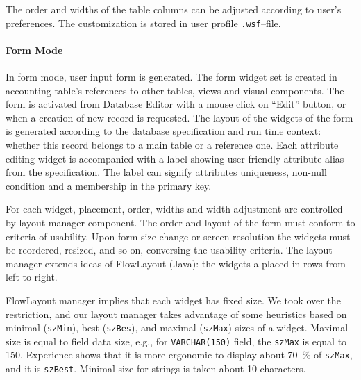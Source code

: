 \documentclass[conference]{IEEEtran}
\begin{document}
The order and widths of the table columns can be adjusted according to user's preferences.  The customization is stored in user profile \texttt{.wsf}--file.

\paragraph{Form Mode}

In form mode, user input form is generated.  The form widget set is created in accounting table's references to other tables, views and visual components.  The form is activated from Database Editor with a mouse click on ``Edit'' button, or when a creation of new record is requested.  The layout of the widgets of the form is generated according to the database specification and run time context: whether this record belongs to a main table or a reference one.  Each attribute editing widget is accompanied with a label showing user-friendly attribute alias from the specification.  The label can signify attributes uniqueness, non-null condition and a membership in the primary key.

For each widget, placement, order, widths and width adjustment are controlled by layout manager component.  The order and layout of the form must conform to criteria of usability.  Upon form size change or screen resolution the widgets must be reordered, resized, and so on, conversing the usability criteria.  The layout manager extends ideas of FlowLayout \cite{flowj} (Java): the widgets a placed in rows from left to right.

FlowLayout manager implies that each widget has fixed size.  We took over the restriction, and our layout manager takes advantage of some heuristics based on minimal (\texttt{szMin}), best (\texttt{szBes}), and maximal (\texttt{szMax}) sizes of a widget.  Maximal size is equal to field data size, e.g., for \texttt{VARCHAR(150)} field, the \texttt{szMax} is equal to 150.  Experience shows that it is more ergonomic to display about 70~\% of \texttt{szMax}, and it is \texttt{szBest}.  Minimal size for strings is taken about 10 characters.
\end{document}
